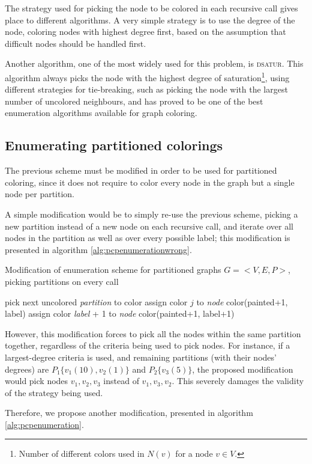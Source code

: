 The strategy used for picking the node to be colored in each recursive call gives place to different algorithms. A very simple strategy is to use the degree of the node, coloring nodes with highest degree first, based on the assumption that difficult nodes should be handled first.

Another algorithm, one of the most widely used for this problem, is \textsc{dsatur}\cite{brelaz1979new}. This algorithm always picks the node with the highest degree of saturation\footnote{Number of different colors used in $N(v)$ for a node $v \in V$.}, using different strategies for tie-breaking, such as picking the node with the largest number of uncolored neighbours\cite{sewell1996improved}, and has proved to be one of the best enumeration algorithms available for graph coloring.

\subsection{Enumerating partitioned colorings}

The previous scheme must be modified in order to be used for partitioned coloring, since it does not require to color every node in the graph but a single node per partition.

A simple modification would be to simply re-use the previous scheme, picking a new partition instead of a new node on each recursive call, and iterate over all nodes in the partition as well as over every possible label; this modification is presented in algorithm \ref{alg:pcpenumerationwrong}. 

\begin{algorithm}
\caption{Modification of enumeration scheme for partitioned graphs $G = <V,E,P>$, picking partitions on every call}
\label{alg:pcpenumerationwrong}

\begin{algorithmic}
		\STATE pick next uncolored \textit{partition} to color		
					\STATE assign color $j$ to \textit{node}
					\CALL color(painted+1, label)
				\ENDIF
			\ENDFOR
			\STATE assign color \textit{label} + 1 to \textit{node}
			\CALL color(painted+1, label+1)
		\ENDFOR
\end{algorithmic}
\end{algorithm}

However, this modification forces to pick all the nodes within the same partition together, regardless of the criteria being used to pick nodes. For instance, if a largest-degree criteria is used, and remaining partitions (with their nodes' degrees) are $P_1 \{v_1(10),v_2(1)\}$ and $P_2 \{v_3(5)\}$, the proposed modification would pick nodes $v_1, v_2, v_3$ instead of $v_1, v_3, v_2$. This severely damages the validity of the strategy being used.

Therefore, we propose another modification, presented in algorithm \ref{alg:pcpenumeration}. 